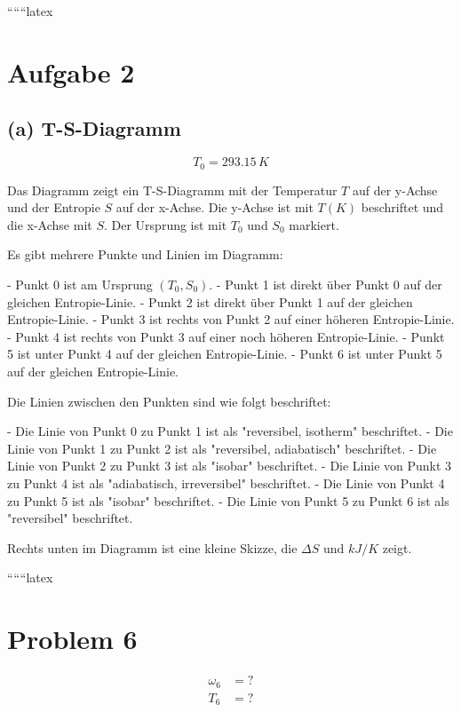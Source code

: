 
``````latex


\section*{Aufgabe 2}

\subsection*{(a) T-S-Diagramm}

\[
T_0 = 293.15 \, K
\]

Das Diagramm zeigt ein T-S-Diagramm mit der Temperatur $T$ auf der y-Achse und der Entropie $S$ auf der x-Achse. Die y-Achse ist mit $T (K)$ beschriftet und die x-Achse mit $S$. Der Ursprung ist mit $T_0$ und $S_0$ markiert. 

Es gibt mehrere Punkte und Linien im Diagramm:

- Punkt 0 ist am Ursprung $(T_0, S_0)$.
- Punkt 1 ist direkt über Punkt 0 auf der gleichen Entropie-Linie.
- Punkt 2 ist direkt über Punkt 1 auf der gleichen Entropie-Linie.
- Punkt 3 ist rechts von Punkt 2 auf einer höheren Entropie-Linie.
- Punkt 4 ist rechts von Punkt 3 auf einer noch höheren Entropie-Linie.
- Punkt 5 ist unter Punkt 4 auf der gleichen Entropie-Linie.
- Punkt 6 ist unter Punkt 5 auf der gleichen Entropie-Linie.

Die Linien zwischen den Punkten sind wie folgt beschriftet:

- Die Linie von Punkt 0 zu Punkt 1 ist als "reversibel, isotherm" beschriftet.
- Die Linie von Punkt 1 zu Punkt 2 ist als "reversibel, adiabatisch" beschriftet.
- Die Linie von Punkt 2 zu Punkt 3 ist als "isobar" beschriftet.
- Die Linie von Punkt 3 zu Punkt 4 ist als "adiabatisch, irreversibel" beschriftet.
- Die Linie von Punkt 4 zu Punkt 5 ist als "isobar" beschriftet.
- Die Linie von Punkt 5 zu Punkt 6 ist als "reversibel" beschriftet.

Rechts unten im Diagramm ist eine kleine Skizze, die $\Delta S$ und $kJ/K$ zeigt.

``````latex


\section*{Problem 6}

\begin{align*}
\omega_6 &= ? \\
T_6 &= ? \\
\end{align*}

